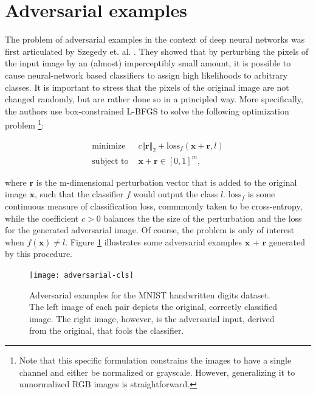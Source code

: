 \documentclass{report}
\begin{document}
\section{Adversarial examples}

\noindent The problem of adversarial examples in the context of deep neural networks was first articulated by Szegedy et. al. \cite{intriguing-properties}. They showed that by perturbing the pixels of the input image by an (almost) imperceptibly small amount, it is possible to cause neural-network based classifiers to assign high likelihoods to arbitrary classes. It is important to stress that the pixels of the original image are not changed randomly, but are rather done so in a principled way. More specifically, the authors use box-constrained L-BFGS \cite{NoceWrig06} to solve the following optimization problem \footnote{Note that this specific formulation constrains the images to have a single channel and either be normalized or grayscale. However, generalizing it to unnormalized RGB images is straightforward.}:

\begin{equation}
\begin{aligned}
\text{minimize } &c \Vert \boldsymbol{r} \Vert_2 + \text{loss}_f(\boldsymbol{x}+\boldsymbol{r}, l) \\
\text{subject to } &\boldsymbol{x} + \boldsymbol{r} \in [0, 1]^m,
\end{aligned}
\label{eq:adv-class-opt}
\end{equation}

\bigskip

\noindent where $\boldsymbol{r}$ is the m-dimensional perturbation vector that is added to the original image $\boldsymbol{x}$, such that the classifier $f$ would output the class $l$. $\text{loss}_f$ is some continuous measure of classification loss, commmonly taken to be cross-entropy, while the coefficient $c > 0$ balances the the size of the perturbation and the loss for the generated adversarial image. Of course, the problem is only of interest when $f(\boldsymbol{x}) \neq l$. Figure \ref{fig:adversarial-cls} illustrates some adversarial examples $\boldsymbol{x}$ + $\boldsymbol{r}$ generated by this procedure.

\bigskip

\begin{figure}[H]
\begin{center}
\texttt{[image: adversarial-cls]}
\caption{Adversarial examples for the MNIST handwritten digits dataset. The left image of each pair depicts the original, correctly classified image. The right image, however, is the adversarial input, derived from the original, that fools the classifier.}
\label{fig:adversarial-cls}
\end{center}
\end{figure}
\end{document}
